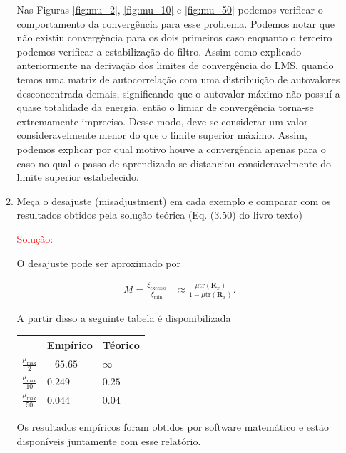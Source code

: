 \documentclass[a4paper,10pt]{article}
\begin{document}
\begin{enumerate}
\begin{enumerate}
						Nas Figuras \ref{fig:mu_2}, \ref{fig:mu_10} e \ref{fig:mu_50} podemos verificar o comportamento da convergência para esse problema. Podemos notar que não existiu convergência para
						os dois primeiros caso enquanto o terceiro podemos verificar a estabilização do filtro. Assim como explicado anteriormente na derivação dos limites de convergência do LMS, quando temos
						uma matriz de autocorrelação com uma distribuição de autovalores desconcentrada demais, significando que o autovalor máximo não possuí a quase totalidade da energia, então o limiar de convergência
						torna-se extremamente impreciso. Desse modo, deve-se considerar um valor consideravelmente menor do que o limite superior máximo. Assim, podemos explicar por qual motivo houve a convergência apenas 
						para o caso no qual o passo de aprendizado se distanciou consideravelmente do limite superior estabelecido.

					\item Meça o desajuste (misadjustment) em cada exemplo e comparar com os resultados obtidos pela solução teórica (Eq. (3.50) do livro texto)					

						\textcolor{red}{Solução:}

						O desajuste pode ser aproximado por

						\begin{align}
							M = \frac{\xi_{\text{excesso}}}{\xi_{\text{min}}} &\approx \frac{\mu \text{tr}(\mathbf{R}_{x})}{1 - \mu \text{tr}(\mathbf{R}_{x})}.
						\end{align}

						A partir disso a seguinte tabela é disponibilizada 

						\begin{table}[!ht]
							\centering
							\begin{tabular}{|l|l|l|}
								\hline
							 	& Empírico & Téorico \\ \hline
							 	$\frac{\mu_{\text{max}}}{2}$ & $-65.65$ &  $\infty$ \\ \hline
							 	$\frac{\mu_{\text{max}}}{10}$ & $0.249$ & $0.25$ \\ \hline
							 	$\frac{\mu_{\text{max}}}{50}$ & $0.044$ & $0.04 $ \\ \hline
							\end{tabular}
						\end{table}

						Os resultados empíricos foram obtidos por software matemático e estão disponíveis juntamente com esse relatório.


\end{enumerate}
\end{enumerate}
\end{document}
